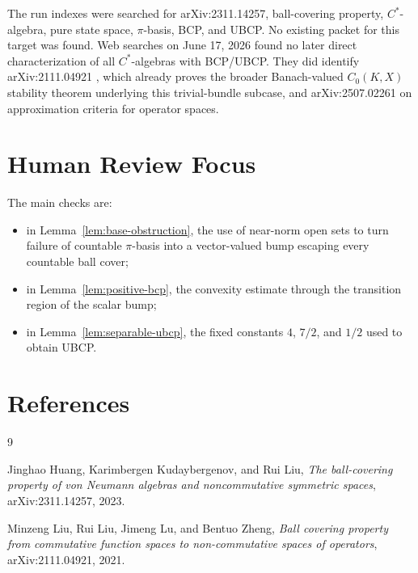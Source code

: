 \documentclass[11pt]{article}
\begin{document}
The run indexes were searched for arXiv:2311.14257, ball-covering property,
\(C^*\)-algebra, pure state space, \(\pi\)-basis, BCP, and UBCP.  No existing
packet for this target was found.  Web searches on June 17, 2026 found no
later direct characterization of all \(C^*\)-algebras with BCP/UBCP.  They did
identify arXiv:2111.04921 \cite{LLLZ}, which already proves the broader
Banach-valued \(C_0(K,X)\) stability theorem underlying this trivial-bundle
subcase, and arXiv:2507.02261 on approximation criteria for operator spaces.

\section*{Human Review Focus}

The main checks are:
\begin{itemize}
    \item in Lemma~\ref{lem:base-obstruction}, the use of near-norm open sets
    to turn failure of countable \(\pi\)-basis into a vector-valued bump
    escaping every countable ball cover;
    \item in Lemma~\ref{lem:positive-bcp}, the convexity estimate through the
    transition region of the scalar bump;
    \item in Lemma~\ref{lem:separable-ubcp}, the fixed constants \(4\), \(7/2\),
    and \(1/2\) used to obtain UBCP.
\end{itemize}

\section*{References}

\begin{thebibliography}{9}

Jinghao Huang, Karimbergen Kudaybergenov, and Rui Liu,
\emph{The ball-covering property of von Neumann algebras and noncommutative
symmetric spaces},
arXiv:2311.14257, 2023.

Minzeng Liu, Rui Liu, Jimeng Lu, and Bentuo Zheng,
\emph{Ball covering property from commutative function spaces to
non-commutative spaces of operators},
arXiv:2111.04921, 2021.

\end{thebibliography}
\end{document}
